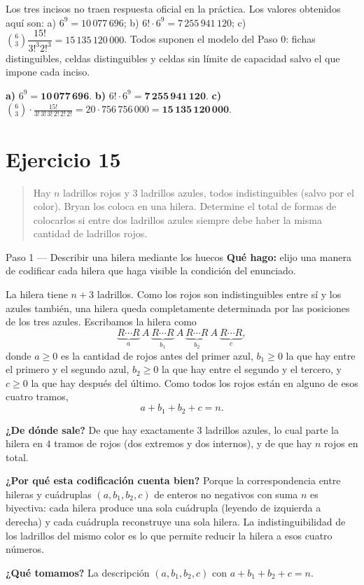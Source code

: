 \documentclass[11pt]{article}
\begin{document}
\begin{nota}
Los tres incisos no traen respuesta oficial en la práctica. Los valores obtenidos aquí son: a) $6^9 = 10\,077\,696$; b) $6!\cdot 6^9 = 7\,255\,941\,120$; c) $\binom{6}{3}\dfrac{15!}{3!^3 2!^3} = 15\,135\,120\,000$. Todos suponen el modelo del Paso 0: fichas distinguibles, celdas distinguibles y celdas sin límite de capacidad salvo el que impone cada inciso.
\end{nota}

\begin{resp}
\textbf{a)} $6^{9} = \mathbf{10\,077\,696}$.\quad
\textbf{b)} $6!\cdot 6^{9} = \mathbf{7\,255\,941\,120}$.\quad
\textbf{c)} $\displaystyle \binom{6}{3}\cdot\frac{15!}{3!\,3!\,3!\,2!\,2!\,2!} = 20\cdot 756\,756\,000 = \mathbf{15\,135\,120\,000}$.
\end{resp}

\section*{Ejercicio 15}

\begin{quote}
Hay $n$ ladrillos rojos y 3 ladrillos azules, todos indistinguibles (salvo por el color). Bryan los coloca en una hilera. Determine el total de formas de colocarlos si entre dos ladrillos azules siempre debe haber la misma cantidad de ladrillos rojos.
\end{quote}

\begin{paso}{Paso 1 --- Describir una hilera mediante los huecos}
\textbf{Qué hago:} elijo una manera de codificar cada hilera que haga visible la condición del enunciado.

La hilera tiene $n+3$ ladrillos. Como los rojos son indistinguibles entre sí y los azules también, una hilera queda completamente determinada por las posiciones de los tres azules. Escribamos la hilera como
\[
\underbrace{R\cdots R}_{a}\ A\ \underbrace{R\cdots R}_{b_1}\ A\ \underbrace{R\cdots R}_{b_2}\ A\ \underbrace{R\cdots R}_{c},
\]
donde $a\ge 0$ es la cantidad de rojos antes del primer azul, $b_1\ge 0$ la que hay entre el primero y el segundo azul, $b_2\ge 0$ la que hay entre el segundo y el tercero, y $c\ge 0$ la que hay después del último. Como todos los rojos están en alguno de esos cuatro tramos,
\[
a+b_1+b_2+c = n .
\]

\textbf{¿De dónde sale?} De que hay exactamente $3$ ladrillos azules, lo cual parte la hilera en $4$ tramos de rojos (dos extremos y dos internos), y de que hay $n$ rojos en total.

\textbf{¿Por qué esta codificación cuenta bien?} Porque la correspondencia entre hileras y cuádruplas $(a,b_1,b_2,c)$ de enteros no negativos con suma $n$ es biyectiva: cada hilera produce una sola cuádrupla (leyendo de izquierda a derecha) y cada cuádrupla reconstruye una sola hilera. La indistinguibilidad de los ladrillos del mismo color es lo que permite reducir la hilera a esos cuatro números.

\textbf{¿Qué tomamos?} La descripción $(a,b_1,b_2,c)$ con $a+b_1+b_2+c=n$.
\end{paso}
\end{document}
